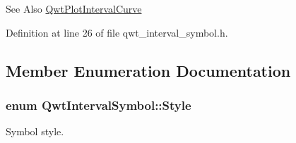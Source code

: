 \begin{DoxySeeAlso}{See Also}
\hyperlink{class_qwt_plot_interval_curve}{Qwt\-Plot\-Interval\-Curve} 
\end{DoxySeeAlso}


Definition at line 26 of file qwt\-\_\-interval\-\_\-symbol.\-h.



\subsection{Member Enumeration Documentation}
\hypertarget{class_qwt_interval_symbol_a8fe960fd50b3ad08765ef8bb632ad77e}{
\subsubsection[{Style}]{\setlength{\rightskip}{0pt plus 5cm}enum {\bf Qwt\-Interval\-Symbol\-::\-Style}}}\label{class_qwt_interval_symbol_a8fe960fd50b3ad08765ef8bb632ad77e}


Symbol style. 

